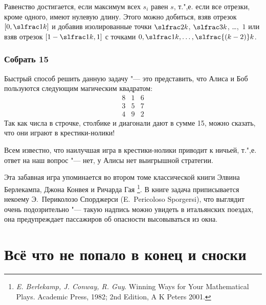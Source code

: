 \documentclass[twoside]{book}
\begin{document}
Равенство достигается, если максимум всех $s_i$ равен $s$, 
т.",е. если все отрезки, кроме одного, имеют нулевую длину.
Этого можно добиться, взяв отрезок $[0,\slfrac1k]$ и добавив изолированные точки
$\slfrac2k$, $\slfrac3k$, \dots,~$1$ или взяв отрезок $[1-\slfrac1k,1]$ с точками
$0,\slfrac1k,\dots,\slfrac{(k-2)}k$.

\subsubsection*{Собрать 15} %

Быстрый способ решить данную задачу "--- это представить, что Алиса и Боб пользуются следующим магическим квадратом:
$$
\begin{matrix}
8&1&6\\
3&5&7\\
4&9&2
\end{matrix}
$$
Так как числа в строчке, столбике и диагонали дают в сумме 15, можно сказать, что они играют в крестики-нолики! 

Всем известно, что наилучшая игра в крестики-нолики приводит к ничьей,
т.",е. ответ на наш вопрос "--- нет, у Алисы нет выигрышной стратегии.
\heart

Эта забавная игра упоминается во втором томе классической книги Элвина Берлекампа, Джона Конвея и Ричарда Гая%
\footnote{\emph{E. Berlekamp, J. Conway, R. Guy}. {Winning Ways for Your Mathematical Plays.} Academic Press, 1982; 2nd Edition, A K Peters 2001.}.
В книге задача приписывается некоему Э.~Периколозо Спорджерси (E.~Pe\-ri\-coloso Sporgersi), что выглядит очень подозрительно "--- такую надпись можно увидеть в итальянских поездах, она предупреждает пассажиров об опасности высовываться из окна.

\section*{Всё что не попало в конец и сноски}


\end{document}
